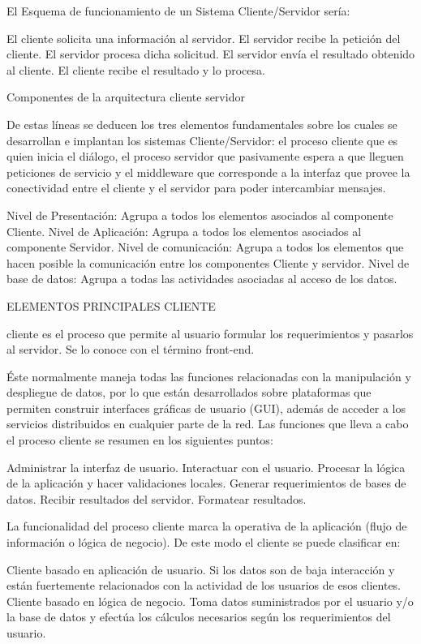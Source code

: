 El Esquema de funcionamiento de un Sistema Cliente/Servidor sería:

    El cliente solicita una información al servidor.
    El servidor recibe la petición del cliente.
    El servidor procesa dicha solicitud.
    El servidor envía el resultado obtenido al cliente.
    El cliente recibe el resultado y lo procesa.


    
Componentes de la arquitectura cliente servidor

De estas líneas se deducen los tres elementos fundamentales sobre los cuales se desarrollan e implantan los sistemas 
Cliente/Servidor: el proceso cliente que es quien inicia el diálogo, el proceso servidor que pasivamente espera a que lleguen 
peticiones de servicio y el middleware que corresponde a la interfaz que provee la conectividad entre el cliente y el servidor 
para poder intercambiar mensajes.
    
Nivel de Presentación: Agrupa a todos los elementos asociados al componente Cliente.
Nivel de Aplicación: Agrupa a todos los elementos asociados al componente Servidor.
Nivel de comunicación: Agrupa a todos los elementos que hacen posible la comunicación entre los componentes Cliente y servidor.
Nivel de base de datos: Agrupa a todas las actividades asociadas al acceso de los datos.


ELEMENTOS PRINCIPALES
CLIENTE

cliente es el proceso que permite al usuario formular los requerimientos y pasarlos al servidor. Se lo conoce con el término front-end.

Éste normalmente maneja todas las funciones relacionadas con la manipulación y despliegue de datos, por lo que están desarrollados 
sobre plataformas que permiten construir interfaces gráficas de usuario (GUI), además de acceder a los servicios distribuidos en 
cualquier parte de la red. Las funciones que lleva a cabo el proceso cliente se resumen en los siguientes puntos:

    Administrar la interfaz de usuario.
    Interactuar con el usuario.
    Procesar la lógica de la aplicación y hacer validaciones locales.
    Generar requerimientos de bases de datos.
    Recibir resultados del servidor.
    Formatear resultados.

La funcionalidad del proceso cliente marca la operativa de la aplicación (flujo de información o lógica de negocio). De este modo el 
cliente se puede clasificar en:

    Cliente basado en aplicación de usuario. Si los datos son de baja interacción y están fuertemente relacionados con la actividad de 
    los usuarios de esos clientes.
    Cliente basado en lógica de negocio. Toma datos suministrados por el usuario y/o la base de datos y efectúa los cálculos necesarios 
    según los requerimientos del usuario.

